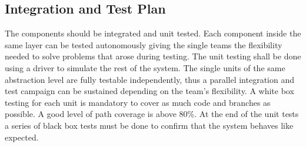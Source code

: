 \subsection{Integration and Test Plan}
The components should be integrated and unit tested. Each component inside the same layer can be tested autonomously giving the single teams the flexibility needed to solve problems that arose during testing. The unit testing shall be done using a driver to simulate the rest of the system.
The single units of the same abstraction level are fully testable independently, thus a parallel integration and test campaign can be sustained depending on the team's flexibility. A white box testing for each unit is mandatory to cover as much code and branches as possible. A good level of path coverage is above 80\%. At the end of the unit tests a series of black box tests must be done to confirm that the system behaves like expected. \cite{ref:box-testing}

